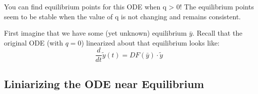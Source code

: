 \documentclass[border=1pt]{article}
\begin{document}
You can find equilibrium points for this ODE when q > 0! The equilibrium points seem to be stable when the value of q is not changing and remains consistent.

First imagine that we have some (yet unknown) equilibrium $\bar{y}$. Recall that the original ODE (with $q=0$) linearized about that equilibrium looks like:
\begin{equation}
\frac{d}{d t} \widetilde{y}(t)=D F(\bar{y}) \cdot \widetilde{y}
\end{equation}
\subsection{Liniarizing the ODE near Equilibrium}
\begin{appendices}
\renewcommand{\rightmark}{Appendix \thesection}

	\begin{landscape}
	\end{landscape}

\end{appendices}
\printindex
\printbibliography
\end{document}
